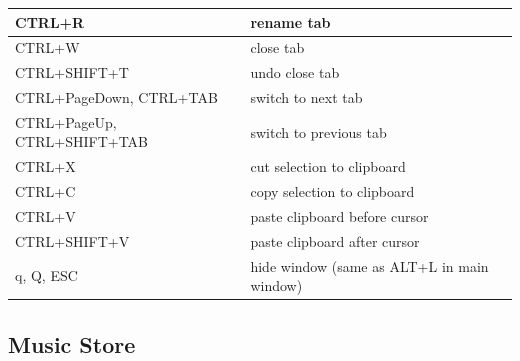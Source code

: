 \documentclass[10pt,english]{article}
\begin{document}
\begin{center}
\begin{tabular}{|m{4cm}|m{10cm}|}
CTRL+R&
rename tab
\\ \hline 

CTRL+W&
close tab
\\ \hline 

CTRL+SHIFT+T&
undo close tab
\\ \hline 

CTRL+PageDown, CTRL+TAB&
switch to next tab
\\ \hline 

CTRL+PageUp, CTRL+SHIFT+TAB&
switch to previous tab
\\ \hline 
\hline 

CTRL+X&
cut selection to clipboard
\\ \hline 

CTRL+C&
copy selection to clipboard
\\ \hline 

CTRL+V&
paste clipboard before cursor
\\ \hline 

CTRL+SHIFT+V&
paste clipboard after cursor
\\ \hline 
\hline 

q, Q, ESC&
hide window (same as ALT+L in main window)
\\ \hline 
\end{tabular}\end{center}



\subsection{Music Store\label{idp1938688}}
\end{document}
